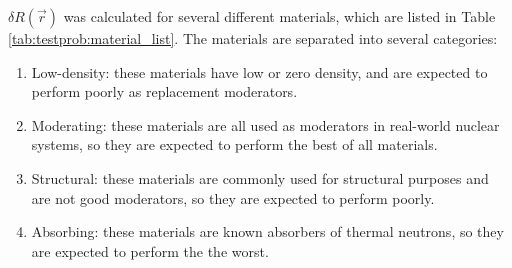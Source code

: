 $\delta R\left(\vec{r}\right)$ was calculated for several different materials, which are listed in Table \ref{tab:testprob:material_list}.
The materials are separated into several categories:
\begin{enumerate}
  \item Low-density: these materials have low or zero density, and are expected to perform poorly as replacement moderators.
  \item Moderating:  these materials are all used as moderators in real-world nuclear systems, so they are expected to perform the best of all materials.
  \item Structural:  these materials are commonly used for structural purposes and are not good moderators, so they are expected to perform poorly.
  \item Absorbing:   these materials are known absorbers of thermal neutrons, so they are expected to perform the the worst.
\end{enumerate}

